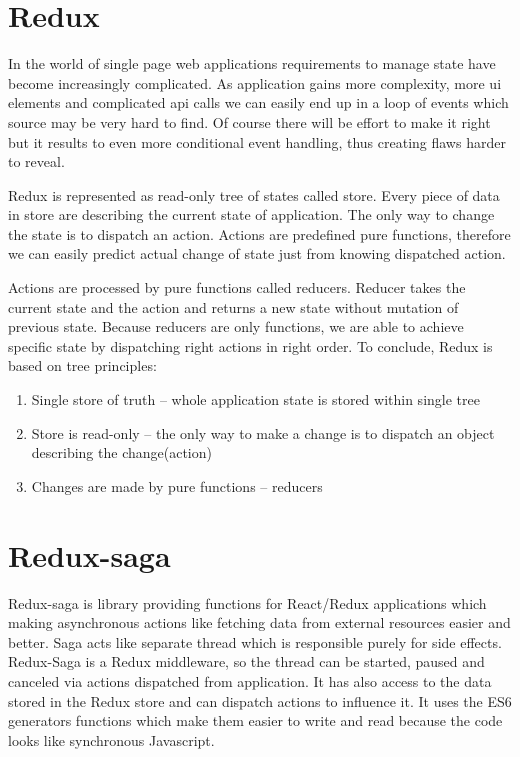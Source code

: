\section{Redux}
In the world of single page web applications requirements to manage state have become increasingly complicated. As application gains more complexity, more ui elements and complicated api calls we can easily end up in a loop of events which source may be very hard to find. Of course there will be effort to make it right but it results to even more conditional event handling, thus creating flaws harder to reveal.

Redux is represented as read-only tree of states called store. Every piece of data in store are describing the current state of application. The only way to change the state is to dispatch an action. Actions are predefined pure functions, therefore we can easily predict actual change of state just from knowing dispatched action.

Actions are processed by pure functions called reducers. Reducer takes the current state and the action and returns a new state without mutation of previous state. Because reducers are only functions, we are able to achieve specific state by dispatching right actions in right order. To conclude, Redux is based on tree principles\cite{treePrinciples}:
\begin{enumerate}
\item Single store of truth -- whole application state is stored within single tree
\item Store is read-only -- the only way to make a change is to dispatch an object describing the change(action)
\item Changes are made by pure functions -- reducers 
\end{enumerate}

\section{Redux-saga}
Redux-saga is library providing functions for React/Redux applications which making asynchronous actions like fetching data from external resources easier and better. Saga acts like separate thread which is responsible purely for side effects. Redux-Saga is a Redux middleware, so the thread can be started, paused and canceled via actions dispatched from application. It has also access to the data stored in the Redux store and can dispatch actions to influence it. It uses the ES6 generators functions which make them easier to write and read because the code looks like synchronous Javascript\cite{redux-saga}.


